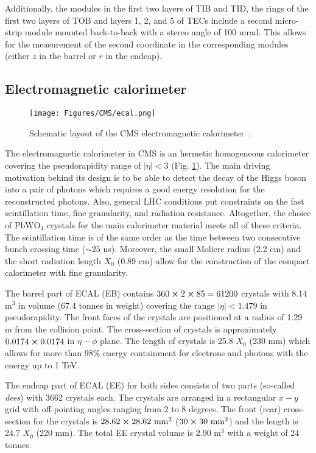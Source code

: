 Additionally, the modules in the first two layers of TIB and TID, the rings of the first two layers of TOB and layers 1, 2, and 5 of TECs include a second micro-strip module mounted back-to-back with a stereo angle of 100 mrad. This allows for the measurement of the second coordinate in the corresponding modules (either $z$ in the barrel or $r$ in the endcap).


\subsection{Electromagnetic calorimeter}\label{sec:ecal}

\begin{figure}[h!]
    \centering
    \texttt{[image: Figures/CMS/ecal.png]}
    \caption{Schematic layout of the CMS electromagnetic calorimeter \cite{CMS:2008xjf}.}
    \label{fig:ecal}
\end{figure}

The electromagnetic calorimeter in CMS is an hermetic homogeneous calorimeter covering the pseudorapidity range of $|\eta|<3$ (Fig. \ref{fig:ecal}). The main driving motivation behind its design is to be able to detect the decay of the Higgs boson into a pair of photons which requires a good energy resolution for the reconstructed photons. Also, general LHC conditions put constraints on the fast scintillation time, fine granularity, and radiation resistance. Altogether, the choice of $\text{PbWO}_4$ crystals for the main calorimeter material meets all of these criteria. The scintillation time is of the same order as the time between two consecutive bunch crossing time ($\sim 25$ ns). Moreover, the small Moliere radius (2.2 cm) and the short radiation length $X_0$ (0.89 cm) allow for the construction of the compact calorimeter with fine granularity.

The barrel part of ECAL (EB) contains $360 \cross 2 \cross 85 = 61200$ crystals with 8.14 $\text{m}^3$ in volume (67.4 tonnes in weight) covering the range $|\eta| < 1.479$ in pseudorapidity. The front faces of the crystals are positioned at a radius of 1.29 m from the collision point. The cross-section of crystals is approximately $0.0174 \cross 0.0174$ in $\eta-\phi$ plane. The length of crystals is 25.8 $X_0$ (230 mm) which allows for more than 98\% energy containment for electrons and photons with the energy up to 1 TeV. 

The endcap part of ECAL (EE) for both sides consists of two parts (so-called \textit{dees}) with 3662 crystals each. The crystals are arranged in a rectangular $x-y$ grid with off-pointing angles ranging from 2 to 8 degrees. The front (rear) cross-section for the crystals is $28.62 \cross 28.62 \text{ mm}^2$ ($30 \cross 30 \text{ mm}^2$) and the length is 24.7 $X_0$ (220 mm). The total EE crystal volume is $2.90 \text{ m}^3$ with a weight of 24 tonnes.  


